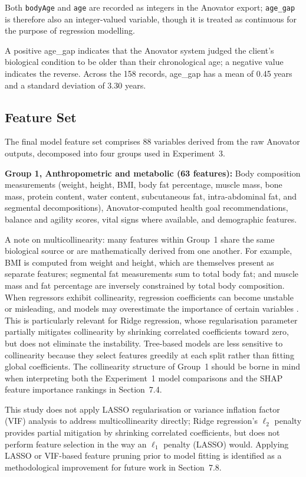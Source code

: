 \documentclass[11pt,a4paper]{report}
\begin{document}
Both \texttt{bodyAge} and \texttt{age} are recorded as integers in the Anovator export; \texttt{age\_gap} is therefore also an integer-valued variable, though it is treated as continuous for the purpose of regression modelling.

A positive age\_gap indicates that the Anovator system judged the client's biological condition to
be older than their chronological age; a negative value indicates the reverse. Across the 158
records, age\_gap has a mean of 0.45 years and a standard deviation of 3.30 years.

\subsection{Feature Set}

The final model feature set comprises 88 variables derived from the raw Anovator outputs, decomposed
into four groups used in Experiment~3.

\textbf{Group 1, Anthropometric and metabolic (63 features):} Body composition measurements
(weight, height, BMI, body fat percentage, muscle mass, bone mass, protein content, water content,
subcutaneous fat, intra-abdominal fat, and segmental decompositions), Anovator-computed health goal
recommendations, balance and agility scores, vital signs where available, and demographic features.

A note on multicollinearity: many features within Group~1 share the same biological source or are
mathematically derived from one another. For example, BMI is computed from weight and height, which
are themselves present as separate features; segmental fat measurements sum to total body fat; and
muscle mass and fat percentage are inversely constrained by total body composition. When regressors
exhibit collinearity, regression coefficients can become unstable or misleading, and models may
overestimate the importance of certain variables \citep{sullivan2001}. This is particularly relevant
for Ridge regression, whose regularisation parameter partially mitigates collinearity by shrinking
correlated coefficients toward zero, but does not eliminate the instability. Tree-based models are
less sensitive to collinearity because they select features greedily at each split rather than
fitting global coefficients. The collinearity structure of Group~1 should be borne in mind when
interpreting both the Experiment~1 model comparisons and the SHAP feature importance rankings in
Section~7.4.

This study does not apply LASSO regularisation or variance inflation factor (VIF) analysis to
address multicollinearity directly; Ridge regression's $\ell_2$ penalty provides partial mitigation
by shrinking correlated coefficients, but does not perform feature selection in the way an $\ell_1$
penalty (LASSO) would. Applying LASSO or VIF-based feature pruning prior to model fitting is
identified as a methodological improvement for future work in Section~7.8.
\end{document}
